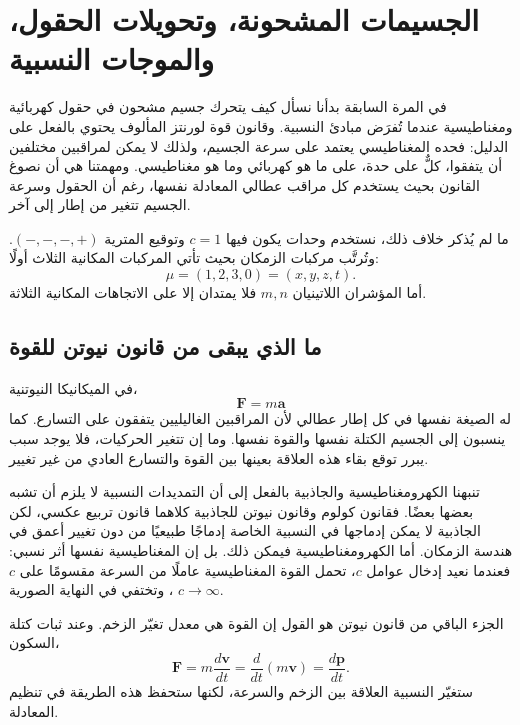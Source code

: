 \chapter{الجسيمات المشحونة، وتحويلات الحقول، والموجات النسبية}

في المرة السابقة بدأنا نسأل كيف يتحرك جسيم مشحون في حقول كهربائية ومغناطيسية عندما تُفرَض مبادئ النسبية. وقانون قوة لورنتز المألوف يحتوي بالفعل على الدليل: فحده المغناطيسي يعتمد على سرعة الجسيم، ولذلك لا يمكن لمراقبين مختلفين أن يتفقوا، كلٌّ على حدة، على ما هو كهربائي وما هو مغناطيسي. ومهمتنا هي أن نصوغ القانون بحيث يستخدم كل مراقب عطالي المعادلة نفسها، رغم أن الحقول وسرعة الجسيم تتغير من إطار إلى آخر.

ما لم يُذكر خلاف ذلك، نستخدم وحدات يكون فيها \(c=1\) وتوقيع المترية \((-,-,-,+)\). وتُرتَّب مركبات الزمكان بحيث تأتي المركبات المكانية الثلاث أولًا:
\begin{equation}
  \mu=(1,2,3,0)=(x,y,z,t).
\end{equation}
أما المؤشران اللاتينيان \(m,n\) فلا يمتدان إلا على الاتجاهات المكانية الثلاثة.

\section{ما الذي يبقى من قانون نيوتن للقوة}

في الميكانيكا النيوتنية،
\begin{equation}
  \boldsymbol F=m\boldsymbol a
\end{equation}
له الصيغة نفسها في كل إطار عطالي لأن المراقبين الغاليليين يتفقون على التسارع. كما ينسبون إلى الجسيم الكتلة نفسها والقوة نفسها. وما إن تتغير الحركيات، فلا يوجد سبب يبرر توقع بقاء هذه العلاقة بعينها بين القوة والتسارع العادي من غير تغيير.

تنبهنا الكهرومغناطيسية والجاذبية بالفعل إلى أن التمديدات النسبية لا يلزم أن تشبه بعضها بعضًا. فقانون كولوم وقانون نيوتن للجاذبية كلاهما قانون تربيع عكسي، لكن الجاذبية لا يمكن إدماجها في النسبية الخاصة إدماجًا طبيعيًا من دون تغيير أعمق في هندسة الزمكان. أما الكهرومغناطيسية فيمكن ذلك. بل إن المغناطيسية نفسها أثر نسبي: فعندما نعيد إدخال عوامل \(c\)، تحمل القوة المغناطيسية عاملًا من السرعة مقسومًا على \(c\)، وتختفي في النهاية الصورية \(c\to\infty\).

الجزء الباقي من قانون نيوتن هو القول إن القوة هي معدل تغيّر الزخم. وعند ثبات كتلة السكون،
\begin{equation}
  \boldsymbol F
  =m\frac{d\boldsymbol v}{dt}
  =\frac{d}{dt}(m\boldsymbol v)
  =\frac{d\boldsymbol p}{dt}.
\end{equation}
ستغيّر النسبية العلاقة بين الزخم والسرعة، لكنها ستحفظ هذه الطريقة في تنظيم المعادلة.

